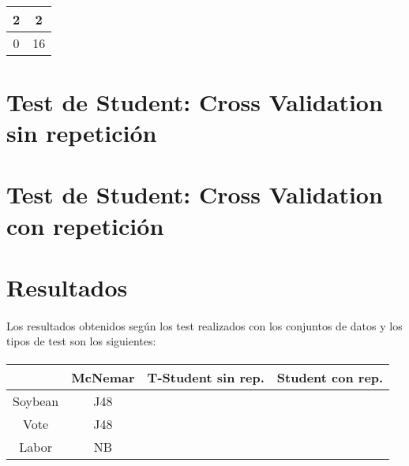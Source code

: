 \documentclass[10pt, a4paper,spanish]{article}
\begin{document}
			\paragraph{}
			\begin{center}
				\begin{tabular}{ | c | c | }
					\hline
					2 & 2 \\ \hline
					0 & 16 \\
					\hline
				\end{tabular}
			\end{center}


	\section{Test de Student: Cross Validation sin repetición}

        \paragraph{}

	\section{Test de Student: Cross Validation con repetición}

	        \paragraph{}
	\section{Resultados}

		\paragraph{}
		Los resultados obtenidos según los test realizados con los conjuntos de datos y los tipos de test son los siguientes:

		\paragraph{}
		\begin{center}
			\begin{tabular}{ | c || c | c | c | }
				\hline
				 			& McNemar	& T-Student sin rep. 	& Student con rep. \\ \hline \hline
				Soybean 	& J48 		& 						& \\ \hline
				Vote 		& J48 		& 						& \\ \hline
				Labor 		& NB 		& 						& \\
				\hline
			\end{tabular}
		\end{center}
\end{document}
